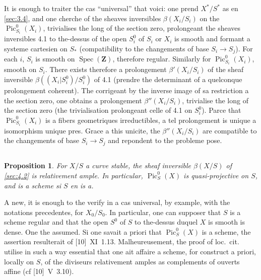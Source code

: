 \documentclass[12pt,a4paper]{article}
\theoremstyle{plain}
\newtheorem{proposition}[theorem]{Proposition}
\theoremstyle{definition}
\theoremstyle{remark}
\DeclareMathOperator{\Pic}{Pic}
\DeclareMathOperator{\Spec}{Spec}
\begin{document}
It is enough to traiter the cas ``universal'' that voici: one prend $X^*/S^*$ as en \ref{sec:3.4}, and one cherche of the sheaves inversibles $\beta(X_i/S_i)$ on the $\Pic_{S_i}^0(X_i)$, trivialises the long of the section zero, prolongeant the sheaves inversibles 4.1 to the-dessus of the open $S_i^0$ of $S_i$ or $X_i$ is smooth and formant a systeme cartesien on $S_*$ (compatibility to the changements of base $S_i \to S_j$). For each $i$, $S_i$ is smooth on $\Spec(\mathbf{Z})$, therefore regular. Similarly for $\Pic_{S_i}^0(X_i)$, smooth on $S_i$. There exists therefore a prolongement $\beta'(X_i/S_i)$ of the sheaf inversible $\beta((X_i|S_i^0)/S_i^0)$ of 4.1 (prendre the determinant of a quelconque prolongement coherent). The corrigeant by the inverse image of sa restriction a the section zero, one obtains a prolongement $\beta''(X_i/S_i)$, trivialise the long of the section zero (the trivialisation prolongeant celle of 4.1 on $S_i^0$). Parce that $\Pic_{S_i}^0(X_i)$ is a fibers geometriques irreductibles, a tel prolongement is unique a isomorphism unique pres. Grace a this unicite, the $\beta''(X_i/S_i)$ are compatible to the changements of base $S_i \to S_j$ and repondent to the probleme pose.

\subsection{}\label{sec:4.3}

\begin{proposition}
For $X/S$ a curve stable, the sheaf inversible $\beta(X/S)$ of \ref{sec:4.2} is relativement ample. In particular, $\Pic_S^0(X)$ is quasi-projective on $S$, and is a scheme si $S$ en is a.
\end{proposition}

A new, it is enough to the verify in a cas universal, by example, with the notations precedentes, for $X_0/S_0$. In particular, one can supposer that $S$ is a scheme regular and that the open $S^0$ of $S$ to the-dessus duquel $X$ is smooth is dense. One the assumed. Si one savait a priori that $\Pic_S^0(X)$ is a scheme, the assertion resulterait of [10]~XI~1.13. Malheureusement, the proof of loc.~cit. utilise in such a way essential that one ait affaire a scheme, for construct a priori, locally on $S$, of the diviseurs relativement amples as complements of ouverts affine (cf [10]~V~3.10).

\subsection{}\label{sec:4.4}
\end{document}
